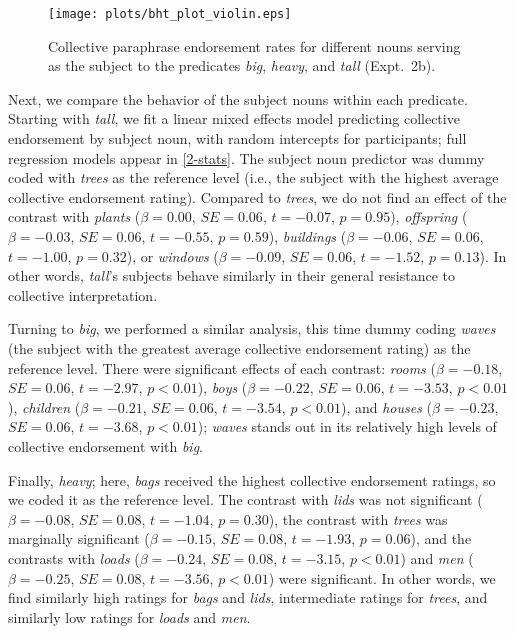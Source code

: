 \documentclass[preprint,12pt,authoryear,titlepage]{elsarticle}
\newcommand{\ndg}[1]{\textcolor{Green}{[ndg: #1]}}
\begin{document}
\begin{figure}[htb]
	\centering
	\texttt{[image: plots/bht\_plot\_violin.eps]}
	\vspace{0pt}
	\caption{Collective paraphrase endorsement rates for different nouns serving as the subject to the predicates \emph{big}, \emph{heavy}, and \emph{tall} (Expt.~2b).} \label{bhtcoll}
\end{figure}


Next, we compare the behavior of the subject nouns within each predicate.  Starting with \emph{tall}, we fit a linear mixed effects model predicting collective endorsement by subject noun, with random intercepts for participants; full regression models appear in \ref{2-stats}. The subject noun predictor was dummy coded with \emph{trees} as the reference level (i.e., the subject with the highest average collective endorsement rating). Compared to \emph{trees}, we do not find an effect of the contrast with \emph{plants} ($\beta=0.00$, $SE=0.06$, $t=-0.07$, $p=0.95$), \emph{offspring} ($\beta=-0.03$, $SE=0.06$, $t=-0.55$, $p=0.59$), \emph{buildings} ($\beta=-0.06$, $SE=0.06$, $t=-1.00$, $p=0.32$), or \emph{windows} ($\beta=-0.09$, $SE=0.06$, $t=-1.52$, $p=0.13$). In other words, \emph{tall}'s subjects behave similarly in their general resistance to collective interpretation. 

Turning to \emph{big}, we performed a similar analysis, this time dummy coding \emph{waves} (the subject with the greatest average collective endorsement rating) as the reference level. There were significant effects of each contrast: \emph{rooms} ($\beta=-0.18$, $SE=0.06$, $t=-2.97$, $p<0.01$), \emph{boys} ($\beta=-0.22$, $SE=0.06$, $t=-3.53$, $p<0.01$), \emph{children} ($\beta=-0.21$, $SE=0.06$, $t=-3.54$, $p<0.01$), and \emph{houses} ($\beta=-0.23$, $SE=0.06$, $t=-3.68$, $p<0.01$); \emph{waves} stands out in its relatively high levels of collective endorsement with \emph{big}.

Finally, \emph{heavy}; here, \emph{bags} received the highest collective endorsement ratings, so we coded it as the reference level. The contrast with \emph{lids} was not significant ($\beta=-0.08$, $SE=0.08$, $t=-1.04$, $p=0.30$), the contrast with \emph{trees} was marginally significant ($\beta=-0.15$, $SE=0.08$, $t=-1.93$, $p=0.06$), and the contrasts with \emph{loads} ($\beta=-0.24$, $SE=0.08$, $t=-3.15$, $p<0.01$) and \emph{men} ($\beta=-0.25$, $SE=0.08$, $t=-3.56$, $p<0.01$) were significant. In other words, we find similarly high ratings for \emph{bags} and \emph{lids}, intermediate ratings for \emph{trees}, and similarly low ratings for \emph{loads} and \emph{men}.
\end{document}
